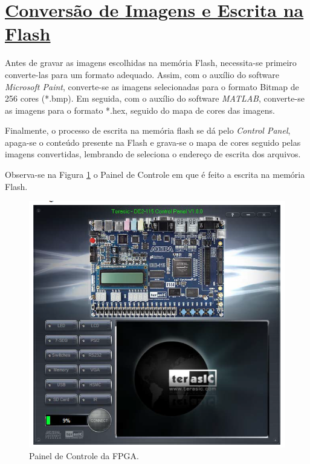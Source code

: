 \documentclass[14pt, oneside]{book}
\newcommand\tab[1][1cm]{\hspace*{#1}}
\theoremstyle{definition}
\begin{document}
                
            \section[Conversão de Imagens e  Escrita na Flash]{\hyperlink{toc}{Conversão de Imagens e  Escrita na Flash}}
            
                \tab Antes de gravar as imagens escolhidas na memória Flash, necessita-se primeiro converte-las para um formato adequado. Assim, com o auxílio do software \textit{Microsoft Paint}, converte-se as imagens selecionadas para o formato Bitmap de 256 cores (*.bmp). Em seguida, com o auxílio do software \textit{MATLAB}, converte-se as imagens para o formato *.hex, seguido do mapa de cores das imagens.
                
                \tab Finalmente, o processo de escrita na memória flash se dá pelo \textit{Control Panel}, apaga-se o conteúdo presente na Flash e grava-se o mapa de cores seguido pelas imagens convertidas, lembrando de seleciona o endereço de escrita dos arquivos. 
                
                \tab Observa-se na Figura \ref{control panel} o Painel de Controle em que é feito a escrita na memória Flash.
                    
                     \begin{figure}[H]
                    \centering
                    \includegraphics[scale=0.7]{control_panel.PNG}
                    \caption{Painel de Controle da FPGA.}
                    \label{control panel}
                \end{figure}
                
\end{document}
